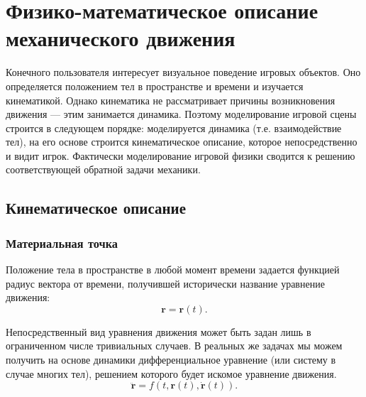 
\section{Физико-математическое описание механического движения}
Конечного пользователя интересует визуальное поведение игровых объектов.
Оно определяется положением тел в пространстве и времени и изучается кинематикой. Однако
кинематика не рассматривает причины возникновения движения --- этим занимается динамика. Поэтому
моделирование игровой сцены строится в следующем порядке: моделируется динамика (т.е. взаимодействие тел), на
его основе строится кинематическое описание, которое непосредственно и видит игрок. Фактически
моделирование игровой физики сводится к решению соответствующей обратной задачи механики.




\subsection{Кинематическое описание}
\subsubsection{Материальная точка}
Положение тела в пространстве в любой момент времени задается функцией радиус вектора от
времени, получившей исторически название уравнение движения:
\begin{equation}
 \mathbf{r}=\mathbf{r}(t).
\end{equation}

Непосредственный вид уравнения движения может быть задан лишь в ограниченном числе 
тривиальных случаев. В реальных же задачах мы можем получить на основе динамики 
дифференциальное уравнение (или систему в случае многих тел), решением которого
будет искомое уравнение движения.
\begin{equation}
 \ddot{\mathbf{r}}=f(t, \mathbf{r}(t), \dot{\mathbf{r}}(t)).
\end{equation}

